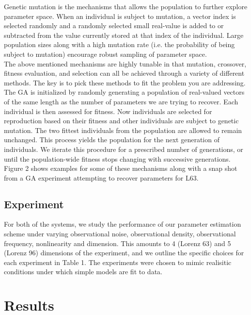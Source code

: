 \documentclass[onecolumn]{article}
\begin{document}
\begin{multicols}{2}
\indent Genetic mutation is the mechanisms that allows the population to further explore parameter space. When an individual is subject to mutation, a vector index is selected randomly and a randomly selected small real-value is added to or subtracted from the value currently stored at that index of the individual. Large population sizes along with a high mutation rate (i.e. the probability of being subject to mutation) encourage robust sampling of parameter space.\\
\indent The above mentioned mechanisms are highly tunable in that mutation, crossover, fitness evaluation, and selection can all be achieved through a variety of different methods. The key is to pick these methods to fit the problem you are addressing. The GA is initialized by randomly generating a population of real-valued vectors of the same length as the number of parameters we are trying to recover. Each individual is then assessed for fitness. Now individuals are selected for reproduction based on their fitness and other individuals are subject to genetic mutation. The two fittest individuals from the population are allowed to remain unchanged. This process yields the population for the next generation of individuals. We iterate this procedure for a prescribed number of generations, or until the population-wide fitness stops changing with successive generations. Figure 2 shows examples for some of these mechanisms along with a snap shot from a GA experiment attempting to recover parameters for L63.

\subsection{Experiment}

For both of the systems, we study the performance of our parameter estimation scheme under varying observational noise, observational density, observational frequency, nonlinearity and dimension.
This amounts to 4 (Lorenz 63) and 5 (Lorenz 96) dimensions of the experiment, and we outline the specific choices for each experiment in Table 1. %
The experiments were chosen to mimic realisitic conditions under which simple models are fit to data.


\section{Results}




\end{multicols}
\end{document}
